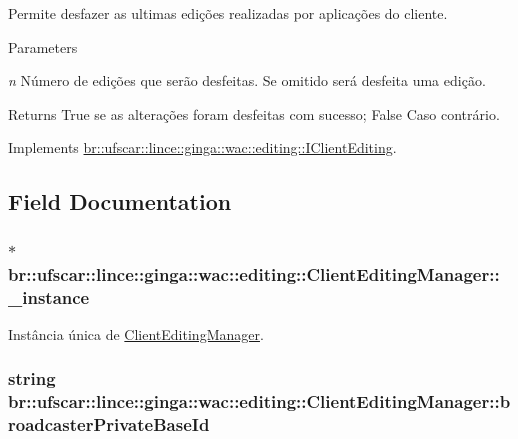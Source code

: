 Permite desfazer as ultimas edições realizadas por aplicações do cliente. 


\begin{DoxyParams}{Parameters}
\item[{\em n}]Número de edições que serão desfeitas. Se omitido será desfeita uma edição. \end{DoxyParams}
\begin{DoxyReturn}{Returns}
True se as alterações foram desfeitas com sucesso; False Caso contrário. 
\end{DoxyReturn}


Implements \hyperlink{classbr_1_1ufscar_1_1lince_1_1ginga_1_1wac_1_1editing_1_1IClientEditing_a8b8cd2e9f79545630e04334d6366e28e}{br::ufscar::lince::ginga::wac::editing::IClientEditing}.



\subsection{Field Documentation}
\hypertarget{classbr_1_1ufscar_1_1lince_1_1ginga_1_1wac_1_1editing_1_1ClientEditingManager_a127cda95b090ee9d020494d2c958be62}{
\subsubsection[{\_\-instance}]{$\ast$ {\bf br::ufscar::lince::ginga::wac::editing::ClientEditingManager::\_\-instance}}}
\label{classbr_1_1ufscar_1_1lince_1_1ginga_1_1wac_1_1editing_1_1ClientEditingManager_a127cda95b090ee9d020494d2c958be62}


Instância única de \hyperlink{classbr_1_1ufscar_1_1lince_1_1ginga_1_1wac_1_1editing_1_1ClientEditingManager}{ClientEditingManager}. 

\hypertarget{classbr_1_1ufscar_1_1lince_1_1ginga_1_1wac_1_1editing_1_1ClientEditingManager_ae6f42fa31a4a78d07977ee83561ed60d}{
\subsubsection[{broadcasterPrivateBaseId}]{\setlength{\rightskip}{0pt plus 5cm}string {\bf br::ufscar::lince::ginga::wac::editing::ClientEditingManager::broadcasterPrivateBaseId}}}
\label{classbr_1_1ufscar_1_1lince_1_1ginga_1_1wac_1_1editing_1_1ClientEditingManager_ae6f42fa31a4a78d07977ee83561ed60d}


